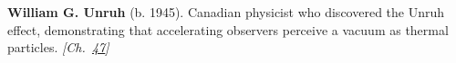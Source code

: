 \textbf{William G. Unruh} (b. 1945). Canadian physicist who discovered the Unruh effect, demonstrating that accelerating observers perceive a vacuum as thermal particles. \emph{[Ch.~\hyperref[ch:observervac]{47}]}

